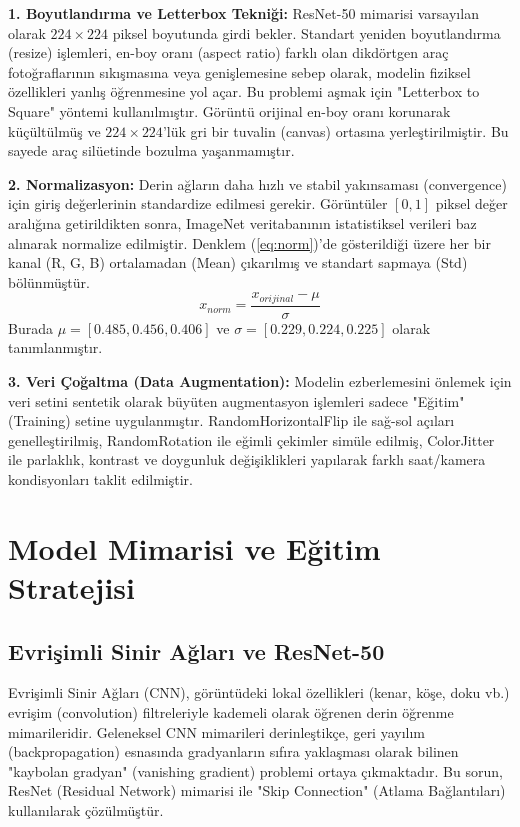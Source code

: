 \documentclass[conference]{IEEEtran}
\begin{document}
\textbf{1. Boyutlandırma ve Letterbox Tekniği:} 
ResNet-50 mimarisi varsayılan olarak $224 \times 224$ piksel boyutunda girdi bekler. Standart yeniden boyutlandırma (resize) işlemleri, en-boy oranı (aspect ratio) farklı olan dikdörtgen araç fotoğraflarının sıkışmasına veya genişlemesine sebep olarak, modelin fiziksel özellikleri yanlış öğrenmesine yol açar. Bu problemi aşmak için "Letterbox to Square" yöntemi kullanılmıştır. Görüntü orijinal en-boy oranı korunarak küçültülmüş ve $224 \times 224$'lük gri bir tuvalin (canvas) ortasına yerleştirilmiştir. Bu sayede araç silüetinde bozulma yaşanmamıştır.

\textbf{2. Normalizasyon:}
Derin ağların daha hızlı ve stabil yakınsaması (convergence) için giriş değerlerinin standardize edilmesi gerekir. Görüntüler $[0, 1]$ piksel değer aralığına getirildikten sonra, ImageNet veritabanının istatistiksel verileri baz alınarak normalize edilmiştir. Denklem (\ref{eq:norm})'de gösterildiği üzere her bir kanal (R, G, B) ortalamadan (Mean) çıkarılmış ve standart sapmaya (Std) bölünmüştür.
\begin{equation}
    x_{norm} = \frac{x_{orijinal} - \mu}{\sigma} \label{eq:norm}
\end{equation}
Burada $\mu = [0.485, 0.456, 0.406]$ ve $\sigma = [0.229, 0.224, 0.225]$ olarak tanımlanmıştır.

\textbf{3. Veri Çoğaltma (Data Augmentation):}
Modelin ezberlemesini önlemek için veri setini sentetik olarak büyüten augmentasyon işlemleri sadece "Eğitim" (Training) setine uygulanmıştır. RandomHorizontalFlip ile sağ-sol açıları genelleştirilmiş, RandomRotation ile eğimli çekimler simüle edilmiş, ColorJitter ile parlaklık, kontrast ve doygunluk değişiklikleri yapılarak farklı saat/kamera kondisyonları taklit edilmiştir.

\section{Model Mimarisi ve Eğitim Stratejisi}

\subsection{Evrişimli Sinir Ağları ve ResNet-50}
Evrişimli Sinir Ağları (CNN), görüntüdeki lokal özellikleri (kenar, köşe, doku vb.) evrişim (convolution) filtreleriyle kademeli olarak öğrenen derin öğrenme mimarileridir. Geleneksel CNN mimarileri derinleştikçe, geri yayılım (backpropagation) esnasında gradyanların sıfıra yaklaşması olarak bilinen "kaybolan gradyan" (vanishing gradient) problemi ortaya çıkmaktadır. Bu sorun, ResNet (Residual Network) mimarisi \cite{ref_resnet} ile "Skip Connection" (Atlama Bağlantıları) kullanılarak çözülmüştür. 
\end{document}
